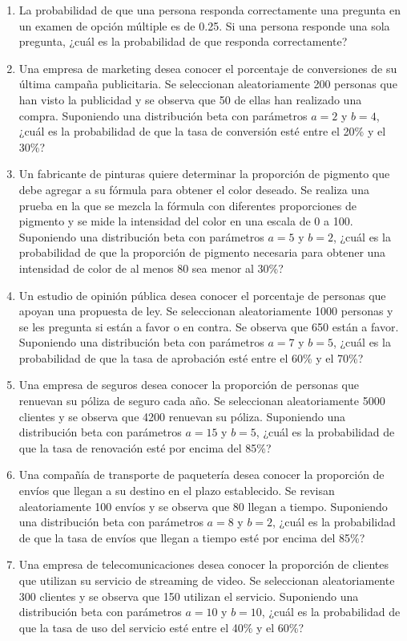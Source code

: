 \begin{Ejer}
\begin{enumerate}
    \item La probabilidad de que una persona responda correctamente una pregunta en un examen de opción múltiple es de 0.25. Si una persona responde una sola pregunta, ¿cuál es la probabilidad de que responda correctamente?    
    \item Una empresa de marketing desea conocer el porcentaje de conversiones de su última campaña publicitaria. Se seleccionan aleatoriamente 200 personas que han visto la publicidad y se observa que 50 de ellas han realizado una compra. Suponiendo una distribución beta con parámetros $a=2$ y $b=4$, ¿cuál es la probabilidad de que la tasa de conversión esté entre el 20\% y el 30\%?
    \item Un fabricante de pinturas quiere determinar la proporción de pigmento que debe agregar a su fórmula para obtener el color deseado. Se realiza una prueba en la que se mezcla la fórmula con diferentes proporciones de pigmento y se mide la intensidad del color en una escala de 0 a 100. Suponiendo una distribución beta con parámetros $a=5$ y $b=2$, ¿cuál es la probabilidad de que la proporción de pigmento necesaria para obtener una intensidad de color de al menos 80 sea menor al 30\%?
    \item Un estudio de opinión pública desea conocer el porcentaje de personas que apoyan una propuesta de ley. Se seleccionan aleatoriamente 1000 personas y se les pregunta si están a favor o en contra. Se observa que 650 están a favor. Suponiendo una distribución beta con parámetros $a=7$ y $b=5$, ¿cuál es la probabilidad de que la tasa de aprobación esté entre el 60\% y el 70\%?
    \item Una empresa de seguros desea conocer la proporción de personas que renuevan su póliza de seguro cada año. Se seleccionan aleatoriamente 5000 clientes y se observa que 4200 renuevan su póliza. Suponiendo una distribución beta con parámetros $a=15$ y $b=5$, ¿cuál es la probabilidad de que la tasa de renovación esté por encima del 85\%?
    \item Una compañía de transporte de paquetería desea conocer la proporción de envíos que llegan a su destino en el plazo establecido. Se revisan aleatoriamente 100 envíos y se observa que 80 llegan a tiempo. Suponiendo una distribución beta con parámetros $a=8$ y $b=2$, ¿cuál es la probabilidad de que la tasa de envíos que llegan a tiempo esté por encima del 85\%?
    \item Una empresa de telecomunicaciones desea conocer la proporción de clientes que utilizan su servicio de streaming de video. Se seleccionan aleatoriamente 300 clientes y se observa que 150 utilizan el servicio. Suponiendo una distribución beta con parámetros $a=10$ y $b=10$, ¿cuál es la probabilidad de que la tasa de uso del servicio esté entre el 40\% y el 60\%?

\end{enumerate}
\end{Ejer}
